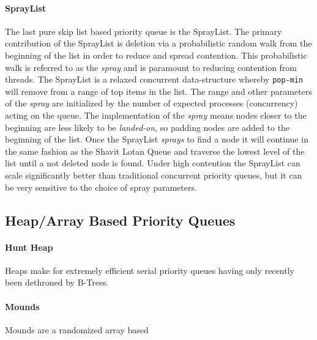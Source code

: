 \paragraph{SprayList} The last pure skip list based priority queue is the SprayList. The primary contribution of the SprayList is deletion via a probabilistic random walk from the beginning of the list in order to reduce and spread contention. This probabilistic walk is referred to as the \textit{spray} and is paramount to reducing contention from threads. The SprayList is a relaxed concurrent data-structure whereby \texttt{pop-min} will remove from a range of top items in the list. The range and other parameters of the \textit{spray} are initialized by the number of expected processes (concurrency) acting on the queue. The implementation of the \textit{spray} means nodes closer to the beginning are less likely to be \textit{landed-on}, so padding nodes are added to the beginning of the list. Once the SprayList \textit{sprays} to find a node it will continue in the same fashion as the Shavit Lotan Queue and traverse the lowest level of the list until a not deleted node is found. Under high contention the SprayList can scale significantly better than traditional concurrent priority queues, but it can be very sensitive to the choice of spray parameters.

\subsection{Heap/Array Based Priority Queues}

\paragraph{Hunt Heap} Heaps make for extremely efficient serial priority queues having only recently been dethroned by B-Trees.

\paragraph{Mounds} Mounds are a randomized array based 